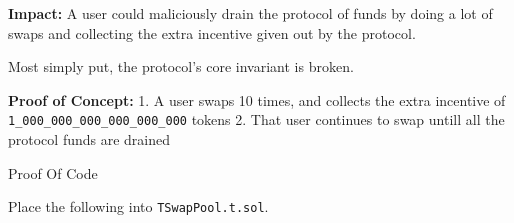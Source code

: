 \textbf{Impact:} A user could maliciously drain the protocol of funds by
doing a lot of swaps and collecting the extra incentive given out by the
protocol.

Most simply put, the protocol's core invariant is broken.

\textbf{Proof of Concept:} 1. A user swaps 10 times, and collects the
extra incentive of \texttt{1\_000\_000\_000\_000\_000\_000} tokens 2.
That user continues to swap untill all the protocol funds are drained

Proof Of Code

Place the following into \texttt{TSwapPool.t.sol}.

\begin{Shaded}
\begin{Highlighting}[]

     \NormalTok{() }\NormalTok{ \{}
\OperatorTok{;}
\NormalTok{(}\OperatorTok{,} \NormalTok{)}\OperatorTok{;}
\NormalTok{(}\OperatorTok{,} \NormalTok{)}\OperatorTok{;}
\NormalTok{(}\OperatorTok{,} \OperatorTok{,} \OperatorTok{,} \NormalTok{))}\OperatorTok{;}
\NormalTok{()}\OperatorTok{;}

\OperatorTok{=} \OperatorTok{;}


\end{Highlighting}
\end{Shaded}
